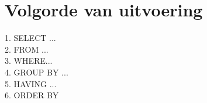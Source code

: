 \section{Volgorde van uitvoering}

1. SELECT ...\\
2. FROM ...\\
3. WHERE...\\
4. GROUP BY ...\\
5. HAVING ...\\
6. ORDER BY\\